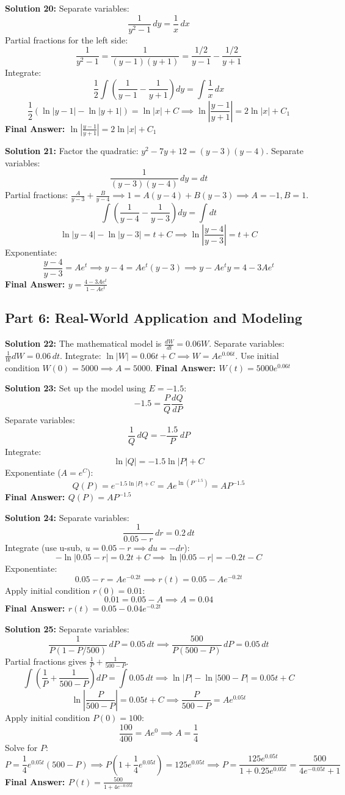 \documentclass[11pt]{article}
\begin{document}
\textbf{Solution 20:}
Separate variables:
\[ \frac{1}{y^2 - 1} \, dy = \frac{1}{x} \, dx \]
Partial fractions for the left side:
\[ \frac{1}{y^2 - 1} = \frac{1}{(y-1)(y+1)} = \frac{1/2}{y-1} - \frac{1/2}{y+1} \]
Integrate:
\[ \frac{1}{2} \int \left( \frac{1}{y-1} - \frac{1}{y+1} \right) dy = \int \frac{1}{x} \, dx \]
\[ \frac{1}{2} (\ln|y-1| - \ln|y+1|) = \ln|x| + C \implies \ln\left|\frac{y-1}{y+1}\right| = 2\ln|x| + C_1 \]
\textbf{Final Answer: $\ln\left|\frac{y-1}{y+1}\right| = 2\ln|x| + C_1$}

\textbf{Solution 21:}
Factor the quadratic: $y^2 - 7y + 12 = (y-3)(y-4)$.
Separate variables:
\[ \frac{1}{(y-3)(y-4)} \, dy = dt \]
Partial fractions: $\frac{A}{y-3} + \frac{B}{y-4} \implies 1 = A(y-4) + B(y-3) \implies A=-1, B=1$.
\[ \int \left( \frac{1}{y-4} - \frac{1}{y-3} \right) dy = \int dt \]
\[ \ln|y-4| - \ln|y-3| = t + C \implies \ln\left|\frac{y-4}{y-3}\right| = t + C \]
Exponentiate:
\[ \frac{y-4}{y-3} = A e^t \implies y - 4 = A e^t (y - 3) \implies y - A e^t y = 4 - 3 A e^t \]
\textbf{Final Answer: $y = \frac{4 - 3Ae^t}{1 - Ae^t}$}

\subsection*{Part 6: Real-World Application and Modeling}

\textbf{Solution 22:}
The mathematical model is $\frac{dW}{dt} = 0.06W$.
Separate variables: $\frac{1}{W} dW = 0.06 \, dt$.
Integrate: $\ln|W| = 0.06t + C \implies W = A e^{0.06t}$.
Use initial condition $W(0) = 5000 \implies A = 5000$.
\textbf{Final Answer: $W(t) = 5000 e^{0.06t}$}

\textbf{Solution 23:}
Set up the model using $E = -1.5$:
\[ -1.5 = \frac{P}{Q}\frac{dQ}{dP} \]
Separate variables:
\[ \frac{1}{Q} \, dQ = -\frac{1.5}{P} \, dP \]
Integrate:
\[ \ln|Q| = -1.5\ln|P| + C \]
Exponentiate ($A = e^C$):
\[ Q(P) = e^{-1.5\ln|P| + C} = A e^{\ln(P^{-1.5})} = A P^{-1.5} \]
\textbf{Final Answer: $Q(P) = A P^{-1.5}$}

\textbf{Solution 24:}
Separate variables:
\[ \frac{1}{0.05 - r} \, dr = 0.2 \, dt \]
Integrate (use u-sub, $u = 0.05-r \implies du = -dr$):
\[ -\ln|0.05 - r| = 0.2t + C \implies \ln|0.05 - r| = -0.2t - C \]
Exponentiate:
\[ 0.05 - r = A e^{-0.2t} \implies r(t) = 0.05 - A e^{-0.2t} \]
Apply initial condition $r(0) = 0.01$:
\[ 0.01 = 0.05 - A \implies A = 0.04 \]
\textbf{Final Answer: $r(t) = 0.05 - 0.04e^{-0.2t}$}

\textbf{Solution 25:}
Separate variables:
\[ \frac{1}{P(1 - P/500)} \, dP = 0.05 \, dt \implies \frac{500}{P(500-P)} \, dP = 0.05 \, dt \]
Partial fractions gives $\frac{1}{P} + \frac{1}{500-P}$.
\[ \int \left(\frac{1}{P} + \frac{1}{500-P}\right) dP = \int 0.05 \, dt \implies \ln|P| - \ln|500-P| = 0.05t + C \]
\[ \ln\left|\frac{P}{500-P}\right| = 0.05t + C \implies \frac{P}{500-P} = A e^{0.05t} \]
Apply initial condition $P(0) = 100$:
\[ \frac{100}{400} = A e^0 \implies A = \frac{1}{4} \]
Solve for $P$:
\[ P = \frac{1}{4}e^{0.05t}(500 - P) \implies P \left(1 + \frac{1}{4}e^{0.05t}\right) = 125e^{0.05t} \implies P = \frac{125e^{0.05t}}{1 + 0.25e^{0.05t}} = \frac{500}{4e^{-0.05t} + 1} \]
\textbf{Final Answer: $P(t) = \frac{500}{1 + 4e^{-0.05t}}$}
\end{document}
